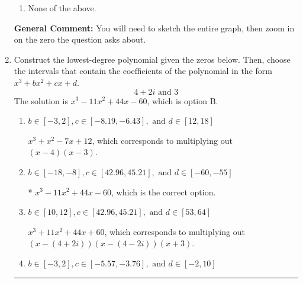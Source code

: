 \documentclass{extbook}[14pt]
\newcommand{\litem}[1]{\item #1

\rule{\textwidth}{0.4pt}}
\begin{document}
\begin{enumerate}
{\begin{enumerate}[label=\Alph*.]
\item None of the above.\end{enumerate}
\textbf{General Comment:} You will need to sketch the entire graph, then zoom in on the zero the question asks about.
}
\litem{
Construct the lowest-degree polynomial given the zeros below. Then, choose the intervals that contain the coefficients of the polynomial in the form $x^3+bx^2+cx+d$.
\[ 4 + 2 i \text{ and } 3 \]The solution is \( x^{3} -11 x^{2} +44 x -60 \), which is option B.\begin{enumerate}[label=\Alph*.]
\item \( b \in [-3, 2], c \in [-8.19, -6.43], \text{ and } d \in [12, 18] \)

$x^{3} + x^{2} -7 x + 12$, which corresponds to multiplying out $(x -4)(x -3)$.
\item \( b \in [-18, -8], c \in [42.96, 45.21], \text{ and } d \in [-60, -55] \)

* $x^{3} -11 x^{2} +44 x -60$, which is the correct option.
\item \( b \in [10, 12], c \in [42.96, 45.21], \text{ and } d \in [53, 64] \)

$x^{3} +11 x^{2} +44 x + 60$, which corresponds to multiplying out $(x-(4 + 2 i))(x-(4 - 2 i))(x + 3)$.
\item \( b \in [-3, 2], c \in [-5.57, -3.76], \text{ and } d \in [-2, 10] \)


\end{enumerate}}
\end{enumerate}
\end{document}
